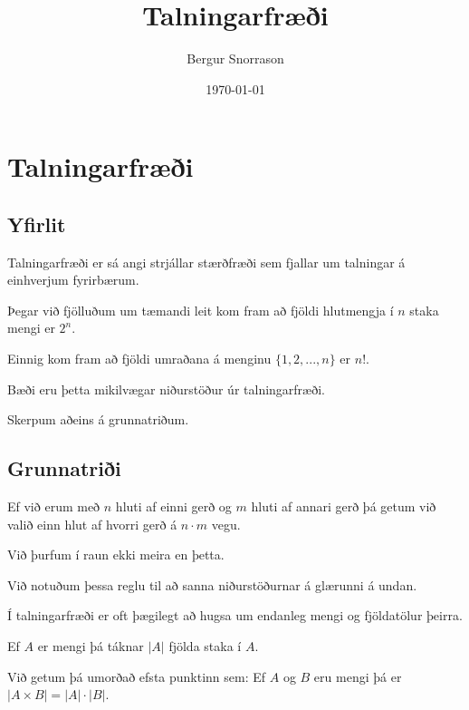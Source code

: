 \title{Talningarfræði}
\author{Bergur Snorrason}
\date{\today}



\frame{\titlepage}

\section{Talningarfræði}
\subsection{Yfirlit}
{
    {
        \item<1-> Talningarfræði er sá angi strjállar stærðfræði sem fjallar um talningar á einhverjum fyrirbærum.
        \item<2-> Þegar við fjölluðum um tæmandi leit kom fram að fjöldi hlutmengja í $n$ staka mengi er $2^n$.
        \item<3-> Einnig kom fram að fjöldi umraðana á menginu $\{1, 2, ..., n\}$ er $n!$.
        \item<4-> Bæði eru þetta mikilvægar niðurstöður úr talningarfræði.
        \item<5-> Skerpum aðeins á grunnatriðum.
    }
}

\subsection{Grunnatriði}
{
    {
        \item<1-> Ef við erum með $n$ hluti af einni gerð og $m$ hluti af annari gerð þá getum við valið einn hlut af hvorri gerð á $n \cdot m$ vegu.
        \item<2-> Við þurfum í raun ekki meira en þetta.
        \item<3-> Við notuðum þessa reglu til að sanna niðurstöðurnar á glærunni á undan.
        \item<4-> Í talningarfræði er oft þægilegt að hugsa um endanleg mengi og fjöldatölur þeirra.
        \item<5-> Ef $A$ er mengi þá táknar $|A|$ fjölda staka í $A$.
        \item<6-> Við getum þá umorðað efsta punktinn sem: Ef $A$ og $B$ eru mengi þá er $|A \times B| = |A| \cdot |B|$.
    }
}


